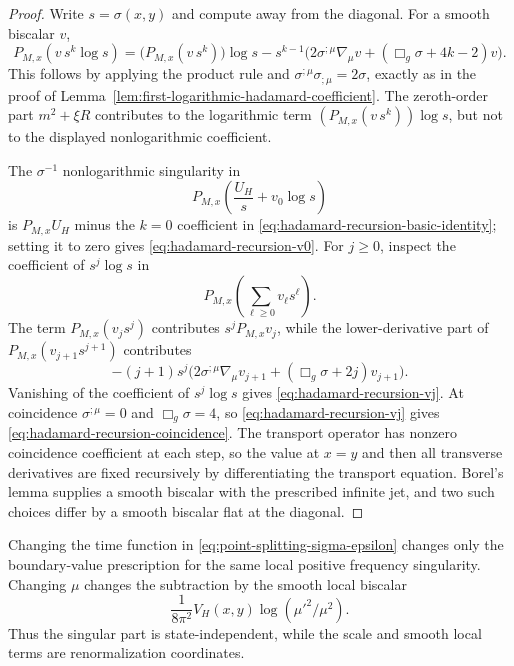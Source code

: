 \begin{proof}
Write \(s=\sigma(x,y)\) and compute away from the diagonal.  For a smooth
biscalar \(v\),
\begin{equation}
  P_{M,x}(v\,s^k\log s)
  =
  \bigl(P_{M,x}(v\,s^k)\bigr)\log s
  -
  s^{k-1}
  \bigl(
    2\sigma^{;\mu}\nabla_\mu v
    +(\Box_g\sigma+4k-2)v
  \bigr).
  \label{eq:hadamard-recursion-basic-identity}
\end{equation}
This follows by applying the product rule and
\(\sigma^{;\mu}\sigma_{;\mu}=2\sigma\), exactly as in the proof of
Lemma~\ref{lem:first-logarithmic-hadamard-coefficient}.  The
zeroth-order part \(m^2+\xi R\) contributes to the logarithmic term
\((P_{M,x}(v\,s^k))\log s\), but not to the displayed nonlogarithmic
coefficient.

The \(\sigma^{-1}\) nonlogarithmic singularity in
\[
  P_{M,x}\left(\frac{U_H}{s}+v_0\log s\right)
\]
is \(P_{M,x}U_H\) minus the \(k=0\) coefficient in
\eqref{eq:hadamard-recursion-basic-identity}; setting it to zero gives
\eqref{eq:hadamard-recursion-v0}.  For \(j\ge0\), inspect the coefficient of
\(s^j\log s\) in
\[
  P_{M,x}\left(\sum_{\ell\ge0}v_\ell s^\ell\right).
\]
The term \(P_{M,x}(v_j s^j)\) contributes \(s^jP_{M,x}v_j\), while the
lower-derivative part of \(P_{M,x}(v_{j+1}s^{j+1})\) contributes
\[
  -(j+1)s^j
  \bigl(
    2\sigma^{;\mu}\nabla_\mu v_{j+1}
    +(\Box_g\sigma+2j)v_{j+1}
  \bigr).
\]
Vanishing of the coefficient of \(s^j\log s\) gives
\eqref{eq:hadamard-recursion-vj}.  At coincidence
\(\sigma^{;\mu}=0\) and \(\Box_g\sigma=4\), so
\eqref{eq:hadamard-recursion-vj} gives
\eqref{eq:hadamard-recursion-coincidence}.  The transport operator has
nonzero coincidence coefficient at each step, so the value at \(x=y\) and
then all transverse derivatives are fixed recursively by differentiating the
transport equation.  Borel's lemma supplies a smooth biscalar with the
prescribed infinite jet, and two such choices differ by a smooth biscalar
flat at the diagonal.
\end{proof}

Changing the time function in \eqref{eq:point-splitting-sigma-epsilon}
changes only the boundary-value prescription for the same local positive
frequency singularity.  Changing \(\mu\) changes the subtraction by the
smooth local biscalar
\begin{equation}
  \frac{1}{8\pi^2}V_H(x,y)\log(\mu'^2/\mu^2).
  \label{eq:point-splitting-scale-change}
\end{equation}
Thus the singular part is state-independent, while the scale and smooth
local terms are renormalization coordinates.

